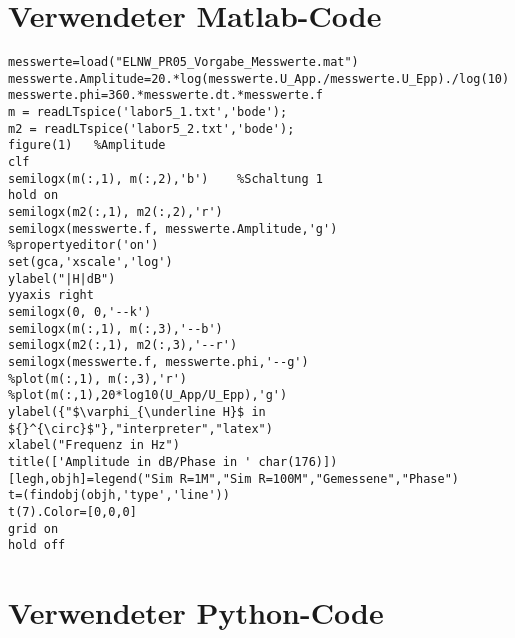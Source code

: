 %
\section{Verwendeter Matlab-Code}
\label{app:Matlab}
%
\begin{verbatim}
messwerte=load("ELNW_PR05_Vorgabe_Messwerte.mat")
messwerte.Amplitude=20.*log(messwerte.U_App./messwerte.U_Epp)./log(10)
messwerte.phi=360.*messwerte.dt.*messwerte.f
m = readLTspice('labor5_1.txt','bode');
m2 = readLTspice('labor5_2.txt','bode');
figure(1)   %Amplitude
clf
semilogx(m(:,1), m(:,2),'b')    %Schaltung 1
hold on
semilogx(m2(:,1), m2(:,2),'r')
semilogx(messwerte.f, messwerte.Amplitude,'g')
%propertyeditor('on')
set(gca,'xscale','log')
ylabel("|H|dB")
yyaxis right
semilogx(0, 0,'--k')
semilogx(m(:,1), m(:,3),'--b')
semilogx(m2(:,1), m2(:,3),'--r')
semilogx(messwerte.f, messwerte.phi,'--g')
%plot(m(:,1), m(:,3),'r')    
%plot(m(:,1),20*log10(U_App/U_Epp),'g')
ylabel({"$\varphi_{\underline H}$ in ${}^{\circ}$"},"interpreter","latex")
xlabel("Frequenz in Hz")
title(['Amplitude in dB/Phase in ' char(176)])
[legh,objh]=legend("Sim R=1M","Sim R=100M","Gemessene","Phase")
t=(findobj(objh,'type','line'))
t(7).Color=[0,0,0]
grid on
hold off
\end{verbatim}

\section{Verwendeter Python-Code}
\label{app:Python}
\inputminted{python}{src/test.py}
%
%
%
%
\begin{flushright}
  \textit{\autorA}
\end{flushright}
%
%
%
%
%
%
%
%
%
%
%